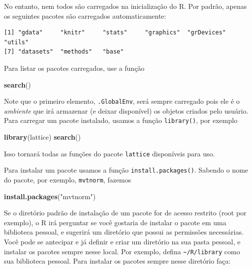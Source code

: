 \documentclass[10pt,a4paper]{book}
\newenvironment{Shaded}{\begin{snugshade}}{\end{snugshade}}
\newcommand{\KeywordTok}[1]{\textcolor[rgb]{0.13,0.29,0.53}{\textbf{#1}}}
\newcommand{\StringTok}[1]{\textcolor[rgb]{0.31,0.60,0.02}{#1}}
\newcommand{\NormalTok}[1]{#1}
\begin{document}
No entanto, nem todos são carregados na inicialização do R. Por padrão,
apenas os seguintes pacotes são carregados automaticamente:

\begin{verbatim}
[1] "gdata"     "knitr"     "stats"     "graphics"  "grDevices" "utils"    
[7] "datasets"  "methods"   "base"     
\end{verbatim}

Para listar os pacotes carregados, use a função

\begin{Shaded}
\begin{Highlighting}[]
\KeywordTok{search}\NormalTok{()}
\end{Highlighting}
\end{Shaded}

Note que o primeiro elemento, \texttt{.GlobalEnv}, será sempre carregado
pois ele é o \emph{ambiente} que irá armazenar (e deixar disponível) os
objetos criados pelo usuário. Para carregar um pacote instalado, usamos
a função \texttt{library()}, por exemplo

\begin{Shaded}
\begin{Highlighting}[]
\KeywordTok{library}\NormalTok{(lattice)}
\KeywordTok{search}\NormalTok{()}
\end{Highlighting}
\end{Shaded}

Isso tornará todas as funções do pacote \texttt{lattice} disponíveis
para uso.

Para instalar um pacote usamos a função \texttt{install.packages()}.
Sabendo o nome do pacote, por exemplo, \texttt{mvtnorm}, fazemos

\begin{Shaded}
\begin{Highlighting}[]
\KeywordTok{install.packages}\NormalTok{(}\StringTok{"mvtnorm"}\NormalTok{)}
\end{Highlighting}
\end{Shaded}

Se o diretório padrão de instalação de um pacote for de acesso restrito
(root por exemplo), o R irá perguntar se você gostaria de instalar o
pacote em uma biblioteca pessoal, e sugerirá um diretório que possui as
permissões necessárias. Você pode se antecipar e já definir e criar um
diretório na sua pasta pessoal, e instalar os pacotes sempre nesse
local. Por exemplo, defina \texttt{\textasciitilde{}/R/library} como sua
biblioteca pessoal. Para instalar os pacotes sempre nesse diretório
faça:
\end{document}
